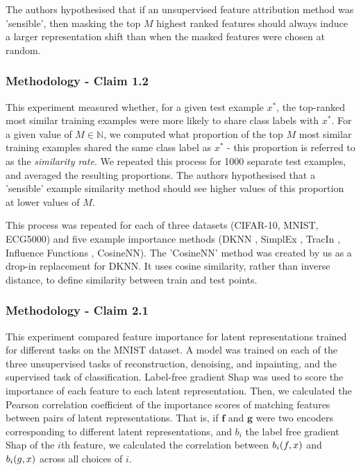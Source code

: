 The authors hypothesised that if an unsupervised feature attribution method was 'sensible', then masking the top $M$ highest ranked features should always induce a larger representation shift than when the masked features were chosen at random. 

\subsubsection{Methodology - Claim 1.2}
This experiment measured whether, for a given test example $x^*$, the top-ranked most similar training examples were more likely to share class labels with $x^*$. For a given value of $M \in \mathbb{N}$, we computed what proportion of the top $M$ most similar training examples shared the same class label as $x^*$ - this proportion is referred to as the \textit{similarity rate}. We repeated this process for 1000 separate test examples, and averaged the resulting proportions. The authors hypothesised that a 'sensible' example similarity method should see higher values of this proportion at lower values of $M$. 

This process was repeated for each of three datasets (CIFAR-10, MNIST, ECG5000) and five example importance methods (DKNN \citep{crabbe2022label}, SimplEx \citep{Crabbe2021Simplex}, TracIn \citep{pruthi2020estimating}, Influence Functions \citep{koh2020understanding}, CosineNN). The 'CosineNN' method was created by us as a drop-in replacement for DKNN. It uses cosine similarity, rather than inverse distance, to define similarity between train and test points.


\subsubsection{Methodology - Claim 2.1}
This experiment compared feature importance for latent representations trained for different tasks on the MNIST dataset. A model was trained on each of the three unsupervised tasks of reconstruction, denoising, and inpainting, and the supervised task of classification. Label-free gradient Shap was used to score the importance of each feature to each latent representation. Then, we calculated the  Pearson correlation coefficient of the importance scores of matching features between pairs of latent representations. That is, if $\mathbf{f}$ and $\mathbf{g}$ were two encoders corresponding to different latent representations, and $b_i$ the label free gradient Shap of the $i$th feature, we calculated the correlation between   $b_i(\boldmath{f},\boldmath{x})$ and $b_i(\boldmath{g},\boldmath{x})$ across all choices of $i$. 


